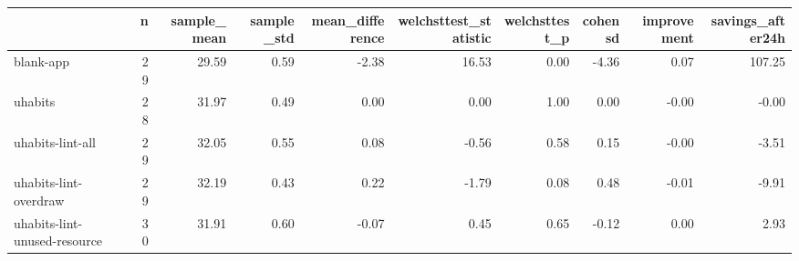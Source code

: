 \begin{tabular}{lrrrrrrrrr}
\toprule
{} &   n &  sample\_mean &  sample\_std &  mean\_difference &  welchsttest\_statistic &  welchsttest\_p &  cohensd &  improvement &  savings\_after24h \\
\midrule
blank-app                    &  29 &        29.59 &        0.59 &            -2.38 &                  16.53 &           0.00 &    -4.36 &         0.07 &            107.25 \\
uhabits                      &  28 &        31.97 &        0.49 &             0.00 &                   0.00 &           1.00 &     0.00 &        -0.00 &             -0.00 \\
uhabits-lint-all             &  29 &        32.05 &        0.55 &             0.08 &                  -0.56 &           0.58 &     0.15 &        -0.00 &             -3.51 \\
uhabits-lint-overdraw        &  29 &        32.19 &        0.43 &             0.22 &                  -1.79 &           0.08 &     0.48 &        -0.01 &             -9.91 \\
uhabits-lint-unused-resource &  30 &        31.91 &        0.60 &            -0.07 &                   0.45 &           0.65 &    -0.12 &         0.00 &              2.93 \\
\bottomrule
\end{tabular}
